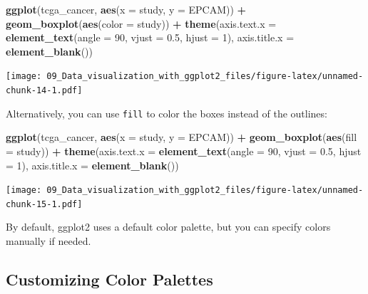 \documentclass[
]{book}
\newenvironment{Shaded}{\begin{snugshade}}{\end{snugshade}}
\newcommand{\AttributeTok}[1]{\textcolor[rgb]{0.13,0.29,0.53}{#1}}
\newcommand{\DecValTok}[1]{\textcolor[rgb]{0.00,0.00,0.81}{#1}}
\newcommand{\FloatTok}[1]{\textcolor[rgb]{0.00,0.00,0.81}{#1}}
\newcommand{\FunctionTok}[1]{\textcolor[rgb]{0.13,0.29,0.53}{\textbf{#1}}}
\newcommand{\NormalTok}[1]{#1}
\newcommand{\SpecialCharTok}[1]{\textcolor[rgb]{0.81,0.36,0.00}{\textbf{#1}}}
\begin{document}
\begin{Shaded}
\begin{Highlighting}[]
\FunctionTok{ggplot}\NormalTok{(tcga\_cancer, }\FunctionTok{aes}\NormalTok{(}\AttributeTok{x =}\NormalTok{ study, }\AttributeTok{y =}\NormalTok{ EPCAM)) }\SpecialCharTok{+}
  \FunctionTok{geom\_boxplot}\NormalTok{(}\FunctionTok{aes}\NormalTok{(}\AttributeTok{color =}\NormalTok{ study)) }\SpecialCharTok{+}
  \FunctionTok{theme}\NormalTok{(}\AttributeTok{axis.text.x =} \FunctionTok{element\_text}\NormalTok{(}\AttributeTok{angle =} \DecValTok{90}\NormalTok{, }\AttributeTok{vjust =} \FloatTok{0.5}\NormalTok{, }\AttributeTok{hjust =} \DecValTok{1}\NormalTok{),}
        \AttributeTok{axis.title.x =} \FunctionTok{element\_blank}\NormalTok{())}
\end{Highlighting}
\end{Shaded}

\texttt{[image: 09\_Data\_visualization\_with\_ggplot2\_files/figure-latex/unnamed-chunk-14-1.pdf]}

Alternatively, you can use \texttt{fill} to color the boxes instead of the outlines:

\begin{Shaded}
\begin{Highlighting}[]
\FunctionTok{ggplot}\NormalTok{(tcga\_cancer, }\FunctionTok{aes}\NormalTok{(}\AttributeTok{x =}\NormalTok{ study, }\AttributeTok{y =}\NormalTok{ EPCAM)) }\SpecialCharTok{+}
  \FunctionTok{geom\_boxplot}\NormalTok{(}\FunctionTok{aes}\NormalTok{(}\AttributeTok{fill =}\NormalTok{ study)) }\SpecialCharTok{+}
  \FunctionTok{theme}\NormalTok{(}\AttributeTok{axis.text.x =} \FunctionTok{element\_text}\NormalTok{(}\AttributeTok{angle =} \DecValTok{90}\NormalTok{, }\AttributeTok{vjust =} \FloatTok{0.5}\NormalTok{, }\AttributeTok{hjust =} \DecValTok{1}\NormalTok{),}
        \AttributeTok{axis.title.x =} \FunctionTok{element\_blank}\NormalTok{())}
\end{Highlighting}
\end{Shaded}

\texttt{[image: 09\_Data\_visualization\_with\_ggplot2\_files/figure-latex/unnamed-chunk-15-1.pdf]}

By default, ggplot2 uses a default color palette, but you can specify colors manually if needed.

\hypertarget{customizing-color-palettes}{%
\subsection{Customizing Color Palettes}\label{customizing-color-palettes}}
\end{document}
